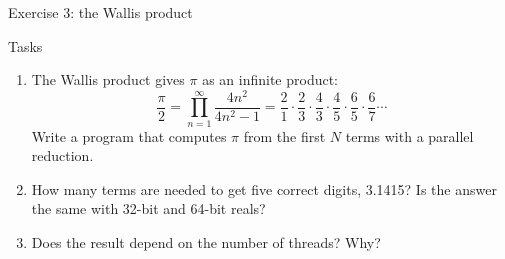 \begin{frame}{Exercise 3: the Wallis product}
  \begin{block}{Tasks}
    \begin{enumerate}
      \item The Wallis product gives $\pi$ as an infinite product:
        \[ \frac{\pi}{2} = \prod_{n=1}^{\infty} \frac{4n^2}{4n^2 - 1} = \frac{2}{1} \cdot \frac{2}{3} \cdot \frac{4}{3} \cdot \frac{4}{5} \cdot \frac{6}{5} \cdot \frac{6}{7} \cdots \]
        Write a program that computes $\pi$ from the first $N$ terms with a parallel reduction.
      \item How many terms are needed to get five correct digits, 3.1415? Is the answer the same with 32-bit and 64-bit reals?
      \item Does the result depend on the number of threads? Why?
    \end{enumerate}
  \end{block}
\end{frame}


